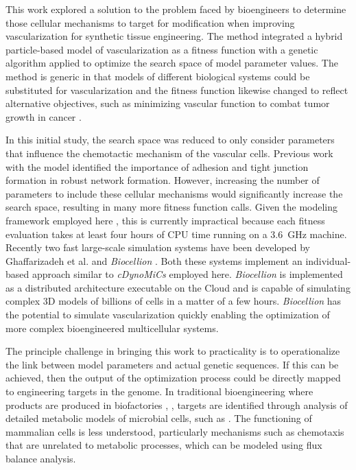 This work explored a solution to the problem faced by bioengineers to determine those cellular mechanisms to target for modification when improving vascularization for synthetic tissue engineering.  The method integrated a hybrid particle-based model of vascularization as a fitness function with a genetic algorithm applied to optimize the search space of model parameter values. The method is generic in that models of different biological systems could be substituted for vascularization and the fitness function likewise changed to reflect alternative objectives, such as minimizing vascular function to combat tumor growth in cancer \cite{Mahoney2010MultiObjective}.

In this initial study, the search space was reduced to only consider parameters that influence the chemotactic mechanism of the vascular cells. Previous work with the model identified the importance of adhesion and tight junction formation in robust network formation. However, increasing the number of parameters to include these cellular mechanisms would significantly increase the search space, resulting in many more fitness function calls. Given the modeling framework employed here \cite{Lardon2011IDynoMiCS}, this is currently impractical because each fitness evaluation takes at least four hours of CPU time running on a 3.6~GHz machine. Recently two fast large-scale simulation systems have been developed by Ghaffarizadeh et al. \cite{ghaffarizadeh2015agent} and \textsl{Biocellion} \cite{delindavis:biocellion}. Both these systems implement an individual-based approach similar to \textsl{cDynoMiCs} employed here. \textsl{Biocellion} is implemented as a distributed architecture executable on the Cloud \cite{Hashem2015Rise} and is capable of simulating complex 3D models of billions of cells in a matter of a few hours. \textsl{Biocellion} has the potential to simulate vascularization quickly enabling the optimization of more complex bioengineered multicellular systems.

The principle challenge in bringing this work to practicality is to operationalize the link between model parameters and actual genetic sequences. If this can be achieved, then the output of the optimization process could be directly mapped to engineering targets in the genome. In traditional bioengineering where products are produced in biofactories \cite{delindavis:Sharma2001Production}, \cite{delindavis:vanDijl2013Bacillus}, targets are identified through analysis of detailed metabolic models of microbial cells, such as \cite{Karp2015Pathway}. The functioning of mammalian cells is less understood, particularly mechanisms such as chemotaxis that are unrelated to metabolic processes, which can be modeled using flux balance analysis.

